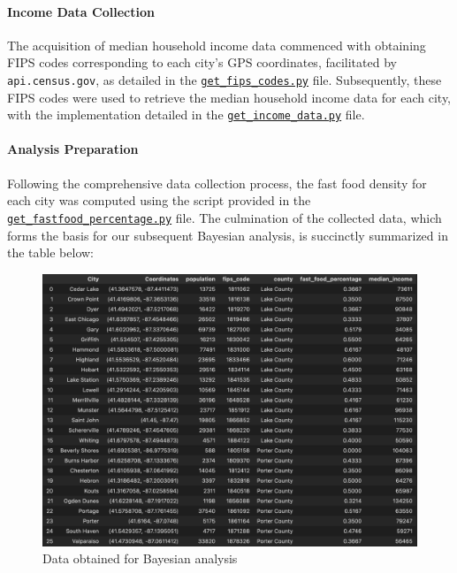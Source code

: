 \documentclass[12pt]{article}
\begin{document}
\paragraph{Income Data Collection}
The acquisition of median household income data commenced with obtaining FIPS codes corresponding to each city's GPS coordinates, facilitated by \texttt{api.census.gov}, as detailed in the \href{https://github.com/cucupac/bayesian-stats/blob/main/project/data_collection/get_fips_code.py}{\texttt{get\_fips\_codes.py}} file. Subsequently, these FIPS codes were used to retrieve the median household income data for each city, with the implementation detailed in the \href{https://github.com/cucupac/bayesian-stats/blob/main/project/data_collection/get_income_data.py}{\texttt{get\_income\_data.py}} file.

\paragraph{Analysis Preparation}
Following the comprehensive data collection process, the fast food density for each city was computed using the script provided in the \href{https://github.com/cucupac/bayesian-stats/blob/main/project/data_collection/get_fastfood_percentage.py}{\texttt{get\_fastfood\_percentage.py}} file. The culmination of the collected data, which forms the basis for our subsequent Bayesian analysis, is succinctly summarized in the table below:

\begin{figure}[h!]
\centering
\includegraphics[width=1.0\textwidth]{../assets/data_table.png} 
\caption{Data obtained for Bayesian analysis}
\label{fig:cond_prob}
\end{figure}
\end{document}
